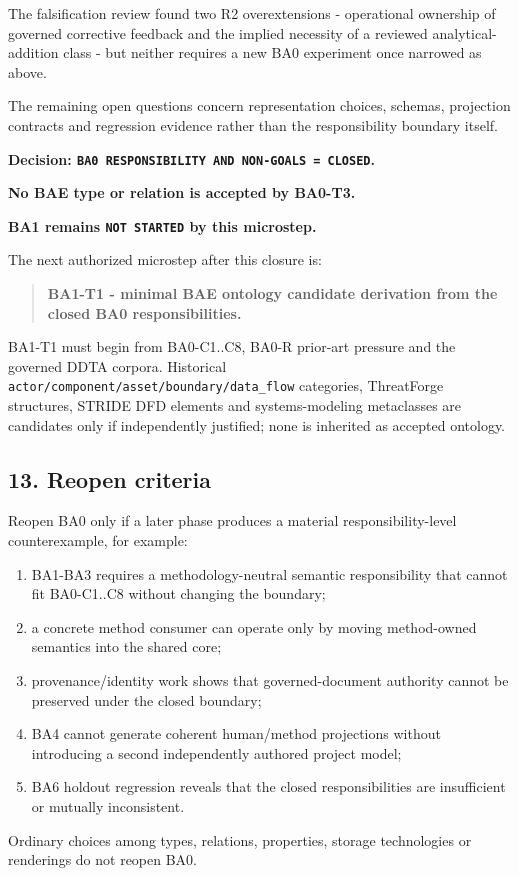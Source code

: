\documentclass[
  10pt,
]{article}
\providecommand{\tightlist}{%
  \setlength{\itemsep}{0pt}\setlength{\parskip}{0pt}}
\begin{document}
The falsification review found two R2 overextensions - operational
ownership of governed corrective feedback and the implied necessity of a
reviewed analytical-addition class - but neither requires a new BA0
experiment once narrowed as above.

The remaining open questions concern representation choices, schemas,
projection contracts and regression evidence rather than the
responsibility boundary itself.

\textbf{Decision:
\texttt{BA0\ RESPONSIBILITY\ AND\ NON-GOALS\ =\ CLOSED}.}

\textbf{No BAE type or relation is accepted by BA0-T3.}

\textbf{BA1 remains \texttt{NOT\ STARTED} by this microstep.}

The next authorized microstep after this closure is:

\begin{quote}
\textbf{BA1-T1 - minimal BAE ontology candidate derivation from the
closed BA0 responsibilities.}
\end{quote}

BA1-T1 must begin from BA0-C1..C8, BA0-R prior-art pressure and the
governed DDTA corpora. Historical
\texttt{actor/component/asset/boundary/data\_flow} categories,
ThreatForge structures, STRIDE DFD elements and systems-modeling
metaclasses are candidates only if independently justified; none is
inherited as accepted ontology.

\subsection{13. Reopen criteria}\label{reopen-criteria}

Reopen BA0 only if a later phase produces a material
responsibility-level counterexample, for example:

\begin{enumerate}
\def\labelenumi{\arabic{enumi}.}
\tightlist
\item
  BA1-BA3 requires a methodology-neutral semantic responsibility that
  cannot fit BA0-C1..C8 without changing the boundary;
\item
  a concrete method consumer can operate only by moving method-owned
  semantics into the shared core;
\item
  provenance/identity work shows that governed-document authority cannot
  be preserved under the closed boundary;
\item
  BA4 cannot generate coherent human/method projections without
  introducing a second independently authored project model;
\item
  BA6 holdout regression reveals that the closed responsibilities are
  insufficient or mutually inconsistent.
\end{enumerate}

Ordinary choices among types, relations, properties, storage
technologies or renderings do not reopen BA0.
\end{document}
